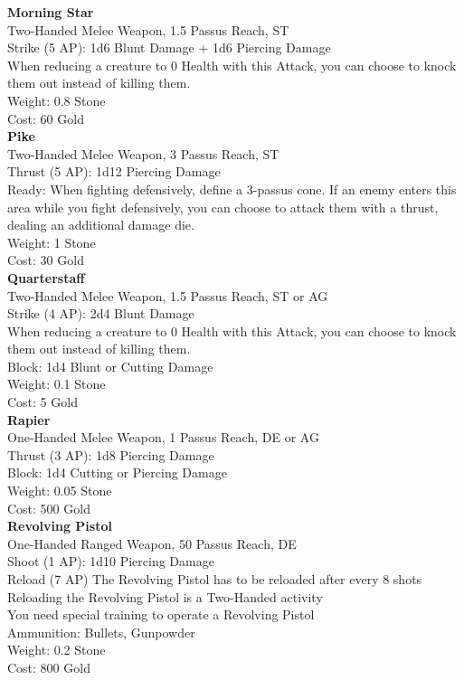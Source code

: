 \textbf{Morning Star}\\
Two-Handed Melee Weapon, 1.5 Passus Reach, ST\\
Strike (5 AP): 1d6 Blunt Damage + 1d6 Piercing Damage\\
When reducing a creature to 0 Health with this Attack, you can choose to knock them out instead of killing them.\\
Weight: 0.8 Stone\\
Cost: 60 Gold\\


\textbf{Pike}\\
Two-Handed Melee Weapon, 3 Passus Reach, ST\\
Thrust (5 AP): 1d12 Piercing Damage\\
Ready: When fighting defensively, define a 3-passus cone. If an enemy enters this area while you fight defensively, you can choose to attack them with a thrust, dealing an additional damage die.\\
Weight: 1 Stone\\
Cost: 30 Gold\\


\textbf{Quarterstaff}\\
Two-Handed Melee Weapon, 1.5 Passus Reach, ST or AG\\
Strike (4 AP): 2d4 Blunt Damage\\
When reducing a creature to 0 Health with this Attack, you can choose to knock them out instead of killing them.\\
Block: 1d4 Blunt or Cutting Damage\\
Weight: 0.1 Stone\\
Cost: 5 Gold\\


\textbf{Rapier}\\
One-Handed Melee Weapon, 1 Passus Reach, DE or AG\\
Thrust (3 AP): 1d8 Piercing Damage\\
Block: 1d4 Cutting or Piercing Damage\\
Weight: 0.05 Stone\\
Cost: 500 Gold\\


\textbf{Revolving Pistol}\\
One-Handed Ranged Weapon, 50 Passus Reach, DE\\
Shoot (1 AP): 1d10 Piercing Damage\\
Reload (7 AP) The Revolving Pistol has to be reloaded after every 8 shots\\
Reloading the Revolving Pistol is a Two-Handed activity\\
You need special training to operate a Revolving Pistol\\
Ammunition: Bullets, Gunpowder\\
Weight: 0.2 Stone\\
Cost: 800 Gold\\


